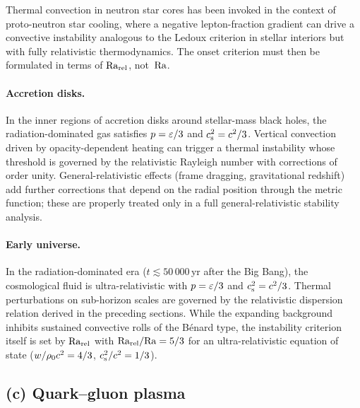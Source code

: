 Thermal convection in neutron star cores has been invoked in the
context of proto-neutron star cooling, where a negative lepton-fraction
gradient can drive a convective instability analogous to the
Ledoux criterion in stellar interiors but with fully relativistic
thermodynamics.  The onset criterion must then be formulated in terms
of $\mathrm{Ra}_{\mathrm{rel}}$, not~$\mathrm{Ra}$.

\paragraph{Accretion disks.}
In the inner regions of accretion disks around stellar-mass black holes,
the radiation-dominated gas satisfies $p = \varepsilon/3$ and
$c_{\mathrm{s}}^{2} = c^{2}/3$.  Vertical convection driven by opacity-dependent
heating can trigger a thermal instability whose threshold is
governed by the relativistic Rayleigh number with corrections of
order unity.  General-relativistic effects (frame dragging,
gravitational redshift) add further corrections that depend on the
radial position through the metric function; these are properly treated
only in a full general-relativistic stability analysis.

\paragraph{Early universe.}
In the radiation-dominated era ($t \lesssim 50\,000$\,yr after the Big
Bang), the cosmological fluid is ultra-relativistic with
$p = \varepsilon/3$ and $c_{\mathrm{s}}^{2} = c^{2}/3$.  Thermal perturbations on
sub-horizon scales are governed by the relativistic dispersion relation
derived in the preceding sections.  While the expanding background
inhibits sustained convective rolls of the B\'enard type,
the instability criterion itself is set by $\mathrm{Ra}_{\mathrm{rel}}$ with
$\mathrm{Ra}_{\mathrm{rel}}/\mathrm{Ra} = 5/3$ for an ultra-relativistic equation of state
($w/\rho_0 c^{2} = 4/3$, $c_{\mathrm{s}}^{2}/c^{2} = 1/3$).


\subsection*{(c) Quark--gluon plasma}


